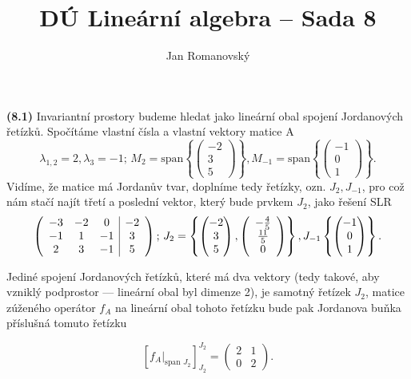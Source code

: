 \documentclass{article}
\title{DÚ Lineární algebra -- Sada 8}
\author{Jan Romanovský}
\begin{document}
\maketitle

\textbf{(8.1)} Invariantní prostory budeme hledat jako lineární obal spojení Jordanových řetízků. Spočítáme vlastní čísla a vlastní vektory matice A
$$\lambda_{1,2} = 2, \lambda_3 = -1;\, M_{2} = \text{span}\left\{\left(\begin{array}{c}
  -2 \\ 3 \\ 5
\end{array}\right)\right\}, M_{-1} = \text{span}\left\{\left(\begin{array}{c}
  -1 \\ 0 \\ 1
\end{array}\right)\right\}.$$
Vidíme, že matice má Jordanův tvar, doplníme tedy řetízky, ozn. $J_2, J_{-1}$, pro což nám stačí najít třetí a poslední vektor, který bude prvkem $J_2$, jako řešení SLR
$$\left(\begin{array}{c c c | c}
  -3 &-2& 0& -2\\ -1& 1& -1& 3\\ 2& 3& -1& 5
\end{array}\right);\, J_{2} = \left\{\left(\begin{matrix}
  -2 \\ 3 \\ 5
\end{matrix}\right), \left(
\begin{array}{c}
 -\frac{4}{5} \\
 \frac{11}{5} \\
 0 \\
\end{array}
\right)\right\}, J_{-1}\left\{ \left(\begin{matrix}
  -1 \\ 0 \\ 1
\end{matrix}\right)\right\}.$$

Jediné spojení Jordanových řetízků, které má dva vektory (tedy takové, aby vzniklý podprostor --- lineární obal byl dimenze 2), je samotný řetízek $J_2$, matice zúženého operátor $f_A$ na lineární obal tohoto řetízku bude pak Jordanova buňka příslušná tomuto řetízku

$$[f_A|_{\text{span } J_2}]^{J_2}_{J_2} = \begin{pmatrix}
  2 & 1 \\ 0 & 2
\end{pmatrix}.$$
\end{document}
